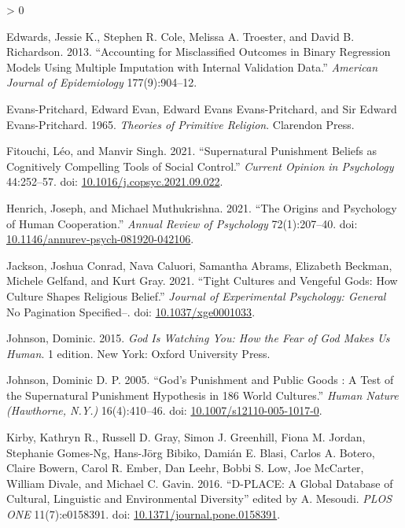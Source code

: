 \documentclass[
]{article}
\newlength{\cslhangindent}
\newenvironment{CSLReferences}[2] %
 {%
  \setlength{\parindent}{0pt}
  \ifodd #1 \everypar{\setlength{\hangindent}{\cslhangindent}}\ignorespaces\fi
  \ifnum #2 > 0
  \setlength{\parskip}{#2\baselineskip}
  \fi
 }%
 {}
\begin{document}
\begin{CSLReferences}{1}{0}
\leavevmode\hypertarget{ref-edwards2013accounting}{}%
Edwards, Jessie K., Stephen R. Cole, Melissa A. Troester, and David B. Richardson. 2013. {``Accounting for Misclassified Outcomes in Binary Regression Models Using Multiple Imputation with Internal Validation Data.''} \emph{American Journal of Epidemiology} 177(9):904--12.

\leavevmode\hypertarget{ref-evans-pritchardTheoriesPrimitiveReligion1965}{}%
Evans-Pritchard, Edward Evan, Edward Evans Evans-Pritchard, and Sir Edward Evans-Pritchard. 1965. \emph{Theories of {Primitive} {Religion}}. Clarendon Press.

\leavevmode\hypertarget{ref-fitouchiSupernaturalPunishmentBeliefs2021}{}%
Fitouchi, Léo, and Manvir Singh. 2021. {``Supernatural Punishment Beliefs as Cognitively Compelling Tools of Social Control.''} \emph{Current Opinion in Psychology} 44:252--57. doi: \href{https://doi.org/10.1016/j.copsyc.2021.09.022}{10.1016/j.copsyc.2021.09.022}.

\leavevmode\hypertarget{ref-henrichOriginsPsychologyHuman2021}{}%
Henrich, Joseph, and Michael Muthukrishna. 2021. {``The {Origins} and {Psychology} of {Human} {Cooperation}.''} \emph{Annual Review of Psychology} 72(1):207--40. doi: \href{https://doi.org/10.1146/annurev-psych-081920-042106}{10.1146/annurev-psych-081920-042106}.

\leavevmode\hypertarget{ref-jacksonTightCulturesVengeful2021}{}%
Jackson, Joshua Conrad, Nava Caluori, Samantha Abrams, Elizabeth Beckman, Michele Gelfand, and Kurt Gray. 2021. {``Tight Cultures and Vengeful Gods: {How} Culture Shapes Religious Belief.''} \emph{Journal of Experimental Psychology: General} No Pagination Specified--. doi: \href{https://doi.org/10.1037/xge0001033}{10.1037/xge0001033}.

\leavevmode\hypertarget{ref-johnsonGodWatchingYou2015}{}%
Johnson, Dominic. 2015. \emph{God {Is} {Watching} {You}: {How} the {Fear} of {God} {Makes} {Us} {Human}}. 1 edition. New York: Oxford University Press.

\leavevmode\hypertarget{ref-johnsonGodPunishmentPublic2005}{}%
Johnson, Dominic D. P. 2005. {``God's Punishment and Public Goods : {A} Test of the Supernatural Punishment Hypothesis in 186 World Cultures.''} \emph{Human Nature (Hawthorne, N.Y.)} 16(4):410--46. doi: \href{https://doi.org/10.1007/s12110-005-1017-0}{10.1007/s12110-005-1017-0}.

\leavevmode\hypertarget{ref-kirbyDPLACEGlobalDatabase2016}{}%
Kirby, Kathryn R., Russell D. Gray, Simon J. Greenhill, Fiona M. Jordan, Stephanie Gomes-Ng, Hans-Jörg Bibiko, Damián E. Blasi, Carlos A. Botero, Claire Bowern, Carol R. Ember, Dan Leehr, Bobbi S. Low, Joe McCarter, William Divale, and Michael C. Gavin. 2016. {``D-{PLACE}: {A} {Global} {Database} of {Cultural}, {Linguistic} and {Environmental} {Diversity}''} edited by A. Mesoudi. \emph{PLOS ONE} 11(7):e0158391. doi: \href{https://doi.org/10.1371/journal.pone.0158391}{10.1371/journal.pone.0158391}.


\end{CSLReferences}
\end{document}
